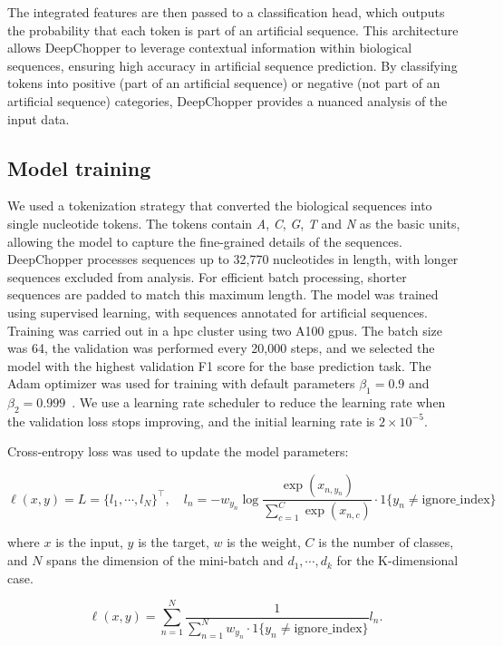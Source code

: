 \documentclass[pdflatex,sn-nature, lineno]{sn-jnl}%
\theoremstyle{thmstyleone}%
\theoremstyle{thmstyletwo}%
\theoremstyle{thmstylethree}%
\begin{document}
The integrated features are then passed to a classification head, which outputs the probability that each token is part of an artificial sequence.
This architecture allows DeepChopper to leverage contextual information within biological sequences, ensuring high accuracy in artificial sequence prediction.
By classifying tokens into positive (part of an artificial sequence) or negative (not part of an artificial sequence) categories, DeepChopper provides a nuanced analysis of the input data.


\subsection{Model training}\label{ssec:training}

We used a tokenization strategy that converted the biological sequences into single nucleotide tokens.
The tokens contain \emph{A}, \emph{C}, \emph{G}, \emph{T} and \emph{N} as the basic units, allowing the model to capture the fine-grained details of the sequences.
DeepChopper processes sequences up to 32,770 nucleotides in length, with longer sequences excluded from analysis.
For efficient batch processing, shorter sequences are padded to match this maximum length.
The model was trained using supervised learning, with sequences annotated for artificial sequences.
Training was carried out in a \gls{hpc} cluster using two A100 \glspl{gpu}.
The batch size was 64, the validation was performed every 20,000 steps, and we selected the model with the highest validation F1 score for the base prediction task.
The Adam optimizer was used for training with default parameters \( \beta_{1} = 0.9 \) and \( \beta_{2} = 0.999 \)~\cite{kingma2014adam}.
We use a learning rate scheduler to reduce the learning rate when the validation loss stops improving, and the initial learning rate is \( 2 \times 10^{-5} \).

Cross-entropy loss was used to update the model parameters:

\[
	\ell(x, y) = L = \{l_1,\cdots,l_N\}^\top, \quad
	l_n = - w_{y_n} \log \frac{\exp(x_{n,y_n})}{\sum_{c=1}^C \exp(x_{n,c})}
	\cdot 1\{y_n \not= \textrm{ignore\_index}\}
\]

where \( x \) is the input, \( y \) is the target, \( w \) is the weight,
\( C \) is the number of classes, and \( N \) spans the dimension of the mini-batch and
\( d_1, \cdots, d_k \) for the K-dimensional case.

\[
	\ell(x, y) =   \sum_{n=1}^N \frac{1}{\sum_{n=1}^N w_{y_n} \cdot 1\{y_n \not= \textrm{ignore\_index}\}} l_n
	.\]
\end{document}
